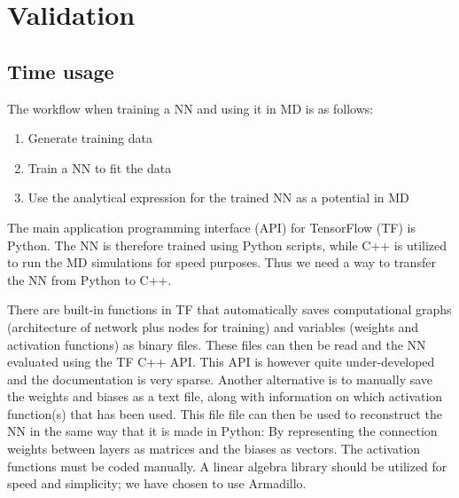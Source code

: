 \documentclass[twoside,english]{uiofysmaster}
\begin{document}
\chapter{Validation}

\section{Time usage} \label{sec:timeUsage}
The workflow when training a NN and using it in MD is as follows: 
\begin{enumerate}
 \item Generate training data
 \item Train a NN to fit the data
 \item Use the analytical expression for the trained NN as a potential in MD
\end{enumerate}
The main application programming interface (API) for TensorFlow (TF) is Python. The NN is therefore
trained using Python scripts, while C++ is utilized to run the MD simulations for speed purposes. Thus
we need a way to transfer the NN from Python to C++. 

There are built-in functions in TF that automatically saves computational graphs (architecture of network plus
nodes for training) and variables (weights and activation functions) as binary files.
These files can then be read and the NN evaluated using the TF C++ API. This API is however quite under-developed
and the documentation is very sparse. Another alternative is to manually save the weights and biases
as a text file, along with information on which activation function(s) that has been used. This file 
file can then be used to reconstruct the NN in the same way that it is made in Python: By representing
the connection weights between layers as matrices and the biases as vectors. The activation functions
must be coded manually. A linear algebra library should
be utilized for speed and simplicity; we have chosen to use Armadillo. 
\end{document}
